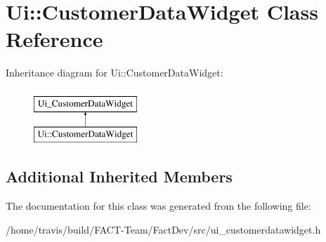 \hypertarget{classUi_1_1CustomerDataWidget}{\section{Ui\-:\-:Customer\-Data\-Widget Class Reference}
\label{classUi_1_1CustomerDataWidget}
}
Inheritance diagram for Ui\-:\-:Customer\-Data\-Widget\-:\begin{figure}[H]
\begin{center}
\leavevmode
\includegraphics[height=2.000000cm]{d1/dd1/classUi_1_1CustomerDataWidget}
\end{center}
\end{figure}
\subsection*{Additional Inherited Members}


The documentation for this class was generated from the following file\-:\begin{DoxyCompactItemize}
\item 
/home/travis/build/\-F\-A\-C\-T-\/\-Team/\-Fact\-Dev/src/ui\-\_\-customerdatawidget.\-h\end{DoxyCompactItemize}
